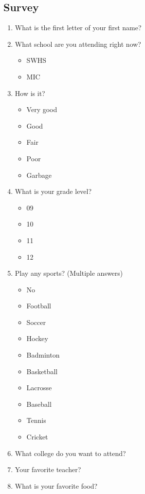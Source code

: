 \documentclass[12pt, letterpaper]{article}
\begin{document}
\subsection{Survey}
\begin{enumerate}
    \item What is the first letter of your first name?
    \item What school are you attending right now?
    \begin{itemize}
        \item SWHS
        \item MIC
    \end{itemize}
    \item How is it?
    \begin{itemize}
        \item Very good
        \item Good
        \item Fair
        \item Poor
        \item Garbage
    \end{itemize}
    \item What is your grade level?
    \begin{itemize}
        \item 09
        \item 10
        \item 11
        \item 12
    \end{itemize}
    \item Play any sports? (Multiple answers)
    \begin{itemize}
        \item No
        \item Football
        \item Soccer
        \item Hockey
        \item Badminton
        \item Basketball
        \item Lacrosse
        \item Baseball
        \item Tennis
        \item Cricket
    \end{itemize}
    \item What college do you want to attend?
    \item Your favorite teacher?
    \item What is your favorite food?

\end{enumerate}
\end{document}
